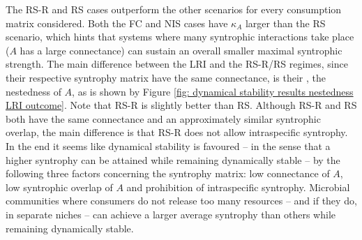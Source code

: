 \documentclass[12pt, titlepage]{report}
\begin{document}
The RS-R and RS cases outperform the other scenarios for every consumption matrix considered. Both the FC and NIS cases have $\kappa_A$ larger than the RS scenario, which hints that systems where many syntrophic interactions take place (\ie $A$ has a large connectance) can sustain an overall smaller maximal syntrophic strength. The main difference between the LRI and the RS-R/RS regimes, since their respective syntrophy matrix have the same connectance, is their , \ie the nestedness of $A$, as is shown by Figure \ref{fig: dynamical stability results nestedness LRI outcome}. Note that RS-R is slightly better than RS. Although RS-R and RS both have the same connectance and an approximately similar syntrophic overlap, the main difference is that RS-R does not allow intraspecific syntrophy. In the end it seems like dynamical stability is favoured -- in the sense that a higher syntrophy can be attained while remaining dynamically stable -- by the following three factors concerning the syntrophy matrix: low connectance of $A$, low syntrophic overlap of $A$ and prohibition of intraspecific syntrophy. Microbial communities where consumers do not release too many resources -- and if they do, in separate niches -- can achieve a larger average syntrophy than others while remaining dynamically stable.
\clearpage
\FloatBarrier
\end{document}
